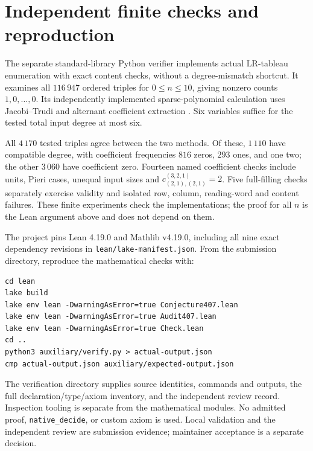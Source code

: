 \documentclass[11pt]{article}
\begin{document}
\section{Independent finite checks and reproduction}
The separate standard-library Python verifier implements actual LR-tableau
enumeration with exact content checks, without a degree-mismatch shortcut.
It examines all $116\,947$ ordered triples for $0\le n\le10$, giving nonzero
counts $1,0,\ldots,0$. Its independently implemented sparse-polynomial
calculation uses Jacobi--Trudi \cite[(39)]{vanleeuwen} and alternant
coefficient extraction \cite[Bi-Alternant Corollary]{stembridge}.
Six variables suffice for the tested total input degree at most six.

All $4\,170$ tested triples agree between the two methods. Of these, $1\,110$
have compatible degree, with coefficient frequencies $816$ zeros, $293$ ones,
and one two; the other $3\,060$ have coefficient zero. Fourteen named
coefficient checks include units, Pieri cases, unequal input sizes and
$c^{(3,2,1)}_{(2,1),(2,1)}=2$. Five full-filling checks separately exercise
validity and isolated row, column, reading-word and content failures.
These finite experiments check the implementations; the proof for all $n$
is the Lean argument above and does not depend on them.

The project pins Lean 4.19.0 and Mathlib v4.19.0, including all nine exact
dependency revisions in \texttt{lean/lake-manifest.json}. From the submission
directory, reproduce the mathematical checks with:
\begin{verbatim}
cd lean
lake build
lake env lean -DwarningAsError=true Conjecture407.lean
lake env lean -DwarningAsError=true Audit407.lean
lake env lean -DwarningAsError=true Check.lean
cd ..
python3 auxiliary/verify.py > actual-output.json
cmp actual-output.json auxiliary/expected-output.json
\end{verbatim}
The verification directory supplies source identities, commands and outputs,
the full declaration/type/axiom inventory, and the independent review record.
Inspection tooling is separate from the mathematical modules. No admitted
proof, \texttt{native\_decide}, or custom axiom is used. Local validation and
the independent review are submission evidence; maintainer acceptance is a
separate decision.
\end{document}
